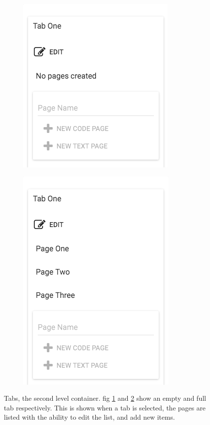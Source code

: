 \begin{figure}
\begin{subfigure}{.5\textwidth}
  \centering
  \includegraphics[width=.8\linewidth]{Figures/PagesEmpty.png}
  \caption{}
  \label{fig:pagesempty}
\end{subfigure}%
\begin{subfigure}{.5\textwidth}
  \centering
  \includegraphics[width=.8\linewidth]{Figures/PagesFull.png}
  \caption{}
  \label{fig:pagesfull}
\end{subfigure}
\caption{Tabs, the second level container. fig \ref{fig:pagesempty} and
\ref{fig:pagesfull} show an empty and full tab respectively. This is shown
when a tab is selected, the pages are listed with the ability to edit the list,
and add new items.}
\label{fig:pages}
\end{figure}

